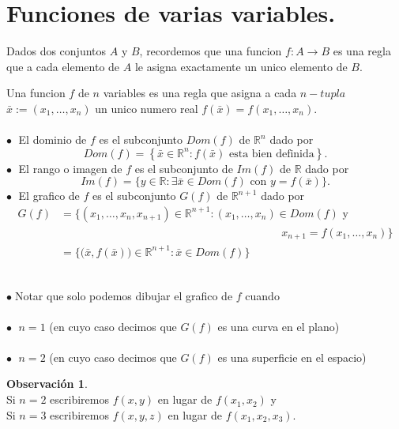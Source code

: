 \documentclass{article}
\theoremstyle{definition}
\theoremstyle{definition}
\newtheorem*{obs}{Observación}
\theoremstyle{remark}
\newcommand\bl{$\bullet\;$}
\begin{document}
\section{Funciones de varias variables.}
Dados dos conjuntos $A$ y $B$, recordemos que una funcion $f: A \to B$ es una regla que a cada elemento de $A$ le asigna exactamente un unico elemento de $B$. 
\begin{defi}
  Una funcion $f$ de $n$ variables es una regla que asigna a cada $n-tupla$ $\bar{x}:= (x_1, \dots , x_n)$ un unico numero real $f(\bar{x})=f(x_1,\dots,x_n)$. \\\\
   \textcolor{rojop2}{\bl} El dominio de $f$ es el subconjunto $Dom(f)$ de $\mathbb{R}^n$ dado por \[
   Dom(f)=\left\{\bar{x} \in \mathbb{R}^n : f(\bar{x}) \text{ esta bien definida}\right\}. \]  
     \textcolor{rojop2}{\bl} El rango o imagen de $f$ es el subconjunto de $Im(f)$ de $\mathbb{R}$ dado por \[ 
       Im(f)=\big\{y \in \mathbb{R} : \exists \bar{x} \in Dom(f) \text{ con } y=f(\bar{x})\big\}.
     \]
     \textcolor{rojop2}{\bl} El grafico de $f$ es el subconjunto $G(f)$ de $\mathbb{R}^{n+1}$ dado por \[ 
       \begin{array}{ll}
       G(f) & = \big\{ (x_1,\dots,x_n,x_{n+1}) \in \mathbb{R}^{n+1} : (x_1,\dots,x_n) \in Dom(f) \text{ y } \\ & \quad \quad \quad \quad \quad \quad \quad \quad \quad \quad \quad \quad \quad \quad \quad \quad \quad \quad \quad \quad  x_{n+1} = f(x_1,\dots,x_n) \big\} \\
              & = \big\{\big(\bar{x},f(\bar{x})\big) \in \mathbb{R}^{n+1} : \bar{x} \in Dom(f)\big\}
       \end{array}
     \]
\end{defi} \; \\
\bl Notar que solo podemos dibujar el grafico de $f$ cuando \\\\
\quad \quad \textcolor{verdep2}{\bl} $n=1$ \quad \big(en cuyo caso decimos que $G(f)$ es una curva en el plano\big) \\\\
\quad \quad \textcolor{verdep2}{\bl} $n=2$ \quad \big(en cuyo caso decimos que $G(f)$ es una superficie en el espacio\big)
\begin{obs}
  \; \\
  \phantom{\bl} Si $n=2$ escribiremos $f(x,y)$ en lugar de $f(x_1,x_2)$ y \\
  \phantom{\bl} Si $n=3$ escribiremos $f(x,y,z)$ en lugar de $f(x_1,x_2,x_3)$.
\end{obs}
\end{document}
